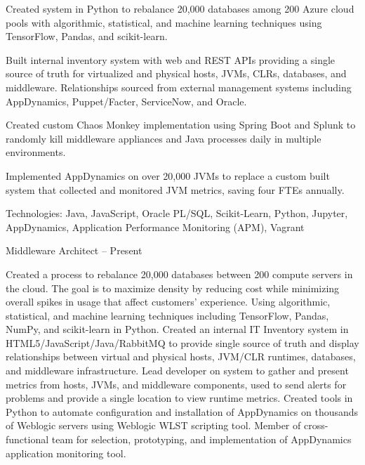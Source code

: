 \documentclass[letterpaper,MMMMyyyy,nonstopmode]{simpleresumecv}
\newif\ifLOCATION
\begin{document}
\begin{Body}
\begin{Detail}
\BulletItem
Created system in Python to rebalance 20,000 databases among 200 Azure cloud pools with algorithmic, statistical, and machine learning techniques using TensorFlow, Pandas, and scikit-learn.

\BulletItem
Built internal inventory system with web and REST APIs providing a single source of truth for virtualized and physical hosts, JVMs, CLRs, databases, and middleware. Relationships sourced from external management systems including AppDynamics, Puppet/Facter, ServiceNow, and Oracle.

\BulletItem
Created custom Chaos Monkey implementation using Spring Boot and Splunk to randomly kill middleware appliances and Java processes daily in multiple environments.

\BulletItem
Implemented AppDynamics on over 20,000 JVMs to replace a custom built system that collected and monitored JVM metrics, saving four FTEs annually.

\Gap
Technologies: Java, JavaScript, Oracle PL/SQL, Scikit-Learn, Python, Jupyter, AppDynamics, Application Performance Monitoring (APM), Vagrant
\end{Detail}

\BigGap

\iffalse %
\Entry
\href{http://www.paychex.com/}
{\textbf{Paychex}}
\ifLOCATION
\hfill 
Rochester, New York
\fi

Middleware Architect
\hfill
{} --
Present

\begin{Detail}
\BulletItem
Created a process to rebalance 20,000 databases between 200 compute servers in the cloud. The goal is to maximize density by reducing cost while minimizing overall spikes in usage that affect customers' experience. Using algorithmic, statistical, and machine learning techniques including TensorFlow, Pandas, NumPy, and scikit-learn in Python.
\BulletItem
Created an internal IT Inventory system in HTML5/JavaScript/Java/RabbitMQ to provide single source of truth and display relationships between virtual and physical hosts, JVM/CLR runtimes, databases, and middleware infrastructure.
\BulletItem
Lead developer on system to gather and present metrics from hosts, JVMs, and middleware components, used to send alerts for problems and provide a single location to view runtime metrics.
\BulletItem
Created tools in Python to automate configuration and installation of AppDynamics on thousands of Weblogic servers using Weblogic WLST scripting tool.
\BulletItem
Member of cross-functional team for selection, prototyping, and implementation of AppDynamics application monitoring tool. 


\end{Detail}
\end{Body}
\end{document}
